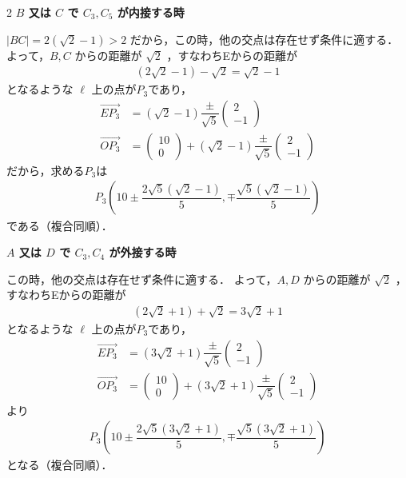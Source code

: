 \documentclass[../../main.tex]{subfiles}
\begin{document}
\begin{multicols}{2}
  \textbf{$B$ 又は $C$ で $C_3, C_5$ が内接する時}

  $|BC|=2(\sqrt{2}-1) > 2$ だから，この時，他の交点は存在せず条件に適する．
  よって，$B, C$ からの距離が $\sqrt{2}$ ，すなわちEからの距離が
  \begin{align}
    \left(2\sqrt{2}-1\right) - \sqrt{2} = \sqrt{2}-1
  \end{align}
  となるような $\ell$ 上の点が$P_3$であり，
  \begin{align}
    \overrightarrow{EP_3}
    & = (\sqrt{2}-1)\dfrac{\pm}{\sqrt{5}}
    \begin{pmatrix} 2 \\ -1
    \end{pmatrix}                                         \\
    \overrightarrow{OP_3}
    & =
    \begin{pmatrix} 10 \\ 0
    \end{pmatrix} + (\sqrt{2}-1)\dfrac{\pm}{\sqrt{5}}
    \begin{pmatrix} 2 \\ -1
    \end{pmatrix}
  \end{align}
  だから，求める$P_3$は
  \begin{align}
    P_3\left(10\pm\dfrac{2\sqrt{5}(\sqrt{2}-1)}{5}, \mp\dfrac{\sqrt{5}(\sqrt{2}-1)}{5}\right)
  \end{align}
  である（複合同順）．

  \textbf{$A$ 又は $D$ で $C_3, C_4$ が外接する時}

  この時，他の交点は存在せず条件に適する．
  よって，$A, D$ からの距離が $\sqrt{2}$ ，すなわちEからの距離が
  \begin{align}
    \left(2\sqrt{2}+1\right) + \sqrt{2} = 3\sqrt{2}+1
  \end{align}
  となるような $\ell$ 上の点が$P_3$であり，
  \begin{align}
    \overrightarrow{EP_3}
    & = (3\sqrt{2}+1)\dfrac{\pm}{\sqrt{5}}
    \begin{pmatrix} 2 \\ -1
    \end{pmatrix}                                          \\
    \overrightarrow{OP_3}
    & =
    \begin{pmatrix} 10 \\ 0
    \end{pmatrix} + (3\sqrt{2}+1)\dfrac{\pm}{\sqrt{5}}
    \begin{pmatrix} 2 \\  -1
    \end{pmatrix}
  \end{align}
  より
  \begin{align}
    P_3\left(10\pm\dfrac{2\sqrt{5}(3\sqrt{2}+1)}{5}, \mp\dfrac{\sqrt{5}(3\sqrt{2}+1)}{5}\right)
  \end{align}
  となる（複合同順）．


\end{multicols}
\end{document}
